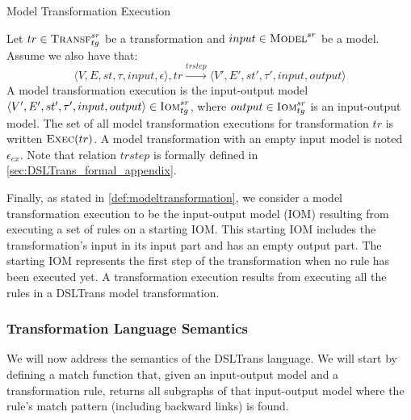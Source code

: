\begin{definition} {Model Transformation Execution\\}
\label{def:modeltransformation} 

Let  $tr\in \textsc{Transf}^{sr}_{tg}$ be a transformation and $input \in \textsc{Model}^{sr}$ be a model. Assume we also have that: $$\langle V,E,st,\tau,input,\epsilon\rangle,tr \xrightarrow{trstep} \langle V',E',st',\tau',input,output\rangle$$
A model transformation execution is the input-output model $\langle V',E',st',\tau',input,output\rangle\in \textsc{Iom}^{sr}_{tg}$, where $output\in \textsc{Iom}^{sr}_{tg}$ is an input-output model. The set of all model transformation executions for transformation $tr$ is written $\textsc{Exec}(tr)$. A model transformation with an empty input model is noted $\epsilon_{ex}$. Note that relation $trstep$ is formally defined in \cref{sec:DSLTrans_formal_appendix}.
\end{definition}


Finally, as stated in \cref{def:modeltransformation}, we consider a model transformation execution to be the input-output model (IOM) resulting from executing a set of rules on a starting IOM. This starting IOM includes the transformation's input in its input part and has an empty output part. The starting IOM represents the first step of the transformation when no rule has been executed yet. A transformation execution results from executing all the rules in a DSLTrans model transformation.

\subsubsection{Transformation Language Semantics}

We will now address the semantics of the DSLTrans language. We will start by defining a match function that, given an input-output model and a transformation rule, returns all subgraphs of that input-output model where the rule's match pattern (including backward links) is found.  


